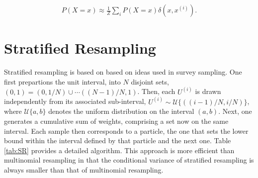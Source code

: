 \documentclass{article}
\begin{document}
\begin{align}
P(X=x) \approx \frac{1}{Z} \sum_i P(X=x) \delta(x,x^{(i)}).
\end{align}

\section{Stratified Resampling} \label{sec:strat}

Stratified resampling is based on based on ideas used in survey sampling\cite{DoucMoulines05}.  One first prepartions the unit interval, into $N$ disjoint sets, $(0,1)=(0,1/N) \cup \cdots ((N-1)/N,1)$.  Then, each $U^{(i)}$ is drawn independently from its associated sub-interval, $U^{(i)} \sim \mathcal{U}\{((i-1)/N,i/N)\}$, where $\mathcal{U}\{a,b\}$ denotes the uniform distribution on the interval $(a,b)$.  Next, one generates a cumulative sum of weights, comprising a set now on the same interval.  Each sample then corresponds to a particle, the one that sets the lower bound within the interval defined by that particle and the next one. Table \ref{tab:SR} provides a detailed algorithm. This approach is more efficient than multinomial resampling in that the conditional variance of stratified resampling is always smaller than that of multinomial resampling.
\end{document}
